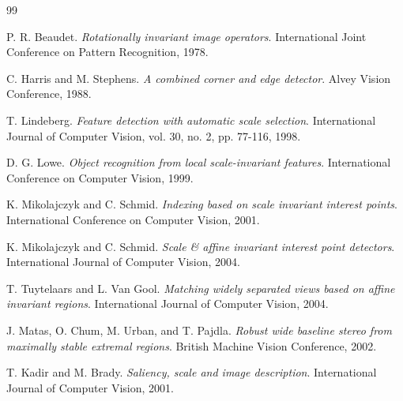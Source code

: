 ﻿\documentclass[11pt, a4paper]{article}
\begin{document}
\newpage

\begin{thebibliography}{99}

P. R. Beaudet.
\emph{Rotationally invariant image operators}.
International Joint Conference on Pattern Recognition, 1978.

C. Harris and M. Stephens.
\emph{A combined corner and edge detector}.
Alvey Vision Conference, 1988.

T. Lindeberg.
\emph{Feature detection with automatic scale selection}.
International Journal of Computer Vision, vol. 30, no. 2, pp. 77-116, 1998.

D. G. Lowe.
\emph{Object recognition from local scale-invariant features}.
International Conference on Computer Vision, 1999.

K. Mikolajczyk and C. Schmid.
\emph{Indexing based on scale invariant interest points}.
International Conference on Computer Vision, 2001.

K. Mikolajczyk and C. Schmid.
\emph{Scale \& affine invariant interest point detectors}.
International Journal of Computer Vision, 2004.

T. Tuytelaars and L. Van Gool.
\emph{Matching widely separated views based on affine invariant regions}.
International Journal of Computer Vision, 2004.

J. Matas, O. Chum, M. Urban, and T. Pajdla.
\emph{Robust wide baseline stereo from maximally stable extremal regions}.
British Machine Vision Conference, 2002.

T. Kadir and M. Brady.
\emph{Saliency, scale and image description}.
International Journal of Computer Vision, 2001.

\end{thebibliography}
\end{document}
